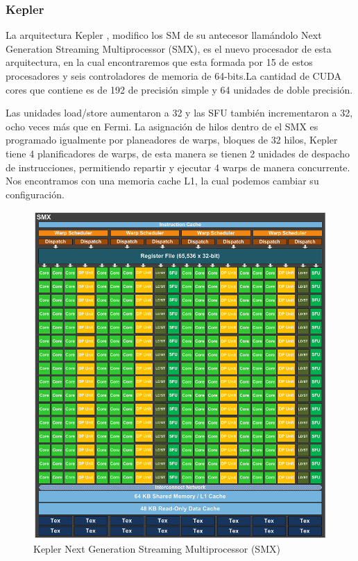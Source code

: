 \subsubsection{Kepler}

La arquitectura Kepler \cite{Kepler}, modifico los SM de su antecesor llamándolo Next Generation Streaming Multiprocessor (SMX), es el nuevo procesador de esta arquitectura, en la cual encontraremos que esta formada por 15 de estos procesadores y seis controladores de memoria de 64-bits.La cantidad de CUDA cores que contiene es de 192 de precisión simple y 64 unidades de doble precisión. 

Las unidades load/store aumentaron a 32 y las SFU también incrementaron a 32, ocho veces más que en Fermi. La asignación de hilos dentro de el SMX es programado igualmente por planeadores de warps, bloques de 32 hilos, Kepler tiene 4 planificadores de warps, de esta manera se tienen 2 unidades de despacho de instrucciones, permitiendo repartir y ejecutar 4 warps de manera concurrente. Nos encontramos con una memoria cache L1, la cual podemos cambiar su configuración. 

\begin{figure}[ph]
			\centering
				\includegraphics[scale=0.4]{img/KeplerSMX.png}
			\caption{Kepler Next Generation Streaming Multiprocessor (SMX) \cite{Kepler}}
\end{figure}

